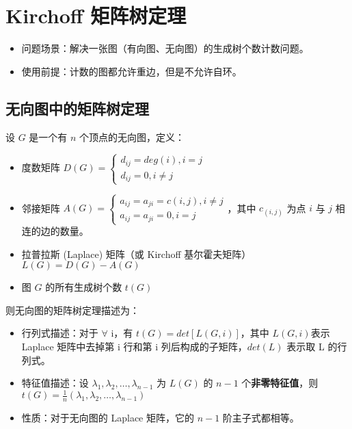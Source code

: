 \section{Kirchoff 矩阵树定理}

\begin{itemize}
    \item 问题场景：解决一张图（有向图、无向图）的生成树个数计数问题。
    \item 使用前提：计数的图都允许重边，但是不允许自环。
\end{itemize}

\subsection{无向图中的矩阵树定理}
\par 设 $G$ 是一个有 $n$ 个顶点的无向图，定义：
\begin{itemize}
\item 度数矩阵 $D(G)=\begin{cases} d_{ij}=deg(i), i = j \\ d_{ij} = 0, i \neq j \end{cases}$
\item 邻接矩阵 $A(G)=\begin{cases} a_{ij}=a_{ji}=c(i,j), i \neq j \\ a_{ij}=a_{ji}=0, i=j \end{cases}$，其中 $c_(i,j)$ 为点 $i$ 与 $j$ 相连的边的数量。
\item 拉普拉斯 (Laplace) 矩阵（或 Kirchoff 基尔霍夫矩阵） $L(G)=D(G)-A(G)$
\item 图 $G$ 的所有生成树个数 $t(G)$
\end{itemize}
\par 则无向图的矩阵树定理描述为：
\begin{itemize}
\item 行列式描述：对于 $\forall$ i，有 $t\left(G\right)=det\left[L\left(G,i\right)\right]$，其中 $L\left(G,i\right) $表示 Laplace 矩阵中去掉第 i 行和第 i 列后构成的子矩阵，$det\left(L\right)$ 表示取 L 的行列式。
\item 特征值描述：设 $\lambda_1,\lambda_2,\ldots,\lambda_{n-1}$ 为 $L\left(G\right)$ 的 $n-1$ 个\textbf{非零特征值}，则 $t\left(G\right)=\frac{1}{n}\left(\lambda_1,\lambda_2,\ldots,\lambda_{n-1}\right)$
\item 性质：对于无向图的 Laplace 矩阵，它的 $n-1$ 阶主子式都相等。
\end{itemize}


